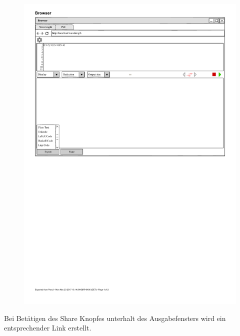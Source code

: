 \documentclass[parskip=full,11pt,twoside]{scrartcl}
\begin{document}
\begin{figure}[H]
	\centering
	\includegraphics{img/exportMenu}
\end{figure}

Bei Betätigen des Share Knopfes unterhalt des Ausgabefensters wird ein entsprechender Link erstellt.
\end{document}
